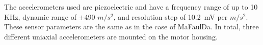 The accelerometers used are piezoelectric and have a frequency range of up to 10 KHz, dynamic range of $\pm$490 $m/s^2$, and resolution step of 10.2~mV per $m/s^2$. These sensor parameters are the same as in the case of MaFaulDa. In total, three different uniaxial accelerometers are mounted on the motor housing.

